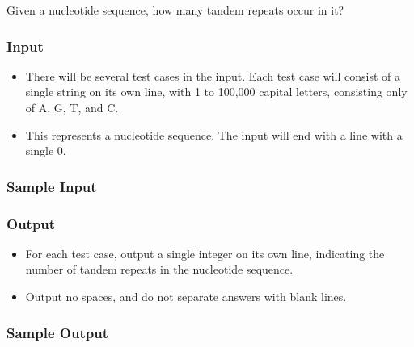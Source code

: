 Given a nucleotide sequence, how many tandem repeats occur in it?

\subsubsection{Input}
\begin{itemize}
	\item There will be several test cases in the input.
	Each test case will consist of a single string on its own line, with 1 to 100,000 capital letters, consisting only of A, G, T, and C.
	\item This represents a nucleotide sequence.
	The input will end with a line with a single 0.
\end{itemize}

\subsubsection{Sample Input}

\subsubsection{Output}
\begin{itemize}
	\item For each test case, output a single integer on its own line, indicating the number of tandem repeats in the nucleotide sequence.
	\item Output no spaces, and do not separate answers with blank lines.
\end{itemize}

\subsubsection{Sample Output}
